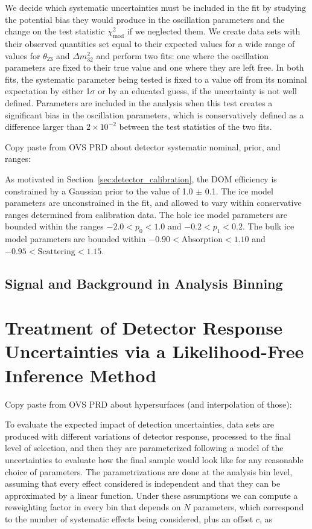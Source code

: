 We decide which systematic uncertainties must be included in the fit by studying the potential bias they would produce in the oscillation parameters and the change on the test statistic $\chi^2_\mathrm{mod}$ if we neglected them. We create data sets with their observed quantities set equal to their expected values for a wide range of values for $\theta_{23}$ and $\Delta m^{2}_{32}$ and perform two fits: one where the oscillation parameters are fixed to their true value and one where they are left free. In both fits, the systematic parameter being tested is fixed to a value off from its nominal expectation by either 1$\sigma$ or by an educated guess, if the uncertainty is not well defined. Parameters are included in the analysis when this test creates a significant bias in the oscillation parameters, which is conservatively defined as a difference larger than $2\times10^{-2}$ between the test statistics of the two fits.

Copy paste from OVS PRD about detector systematic nominal, prior, and ranges:

As motivated in Section~\ref{sec:detector_calibration}, the DOM efficiency is constrained by a Gaussian prior to the value of 1.0 $\pm$ 0.1. The ice model parameters are unconstrained in the fit, and allowed to vary within conservative ranges determined from calibration data. The hole ice model parameters are bounded within the ranges $-2.0<p_{0}<1.0$ and $-0.2<p_{1}<0.2$. The bulk ice model parameters are bounded within $-0.90 < \mathrm{Absorption} < 1.10$ and $-0.95 < \mathrm{Scattering} < 1.15$.


\subsection{Signal and Background in Analysis Binning}


\section{Treatment of Detector Response Uncertainties via a Likelihood-Free Inference Method} 



Copy paste from OVS PRD about hypersurfaces (and interpolation of those):

To evaluate the expected impact of detection uncertainties, data sets are produced with different variations of detector response, processed to the final level of selection, and then they are parameterized following a model of the uncertainties to evaluate how the final sample would look like for any reasonable choice of parameters. The parametrizations are done at the analysis bin level, assuming that every effect considered is independent and that they can be approximated by a linear function. Under these assumptions we can compute a reweighting factor in every bin that depends on $N$ parameters, which correspond to the number of systematic effects being considered, plus an offset $c$, as


